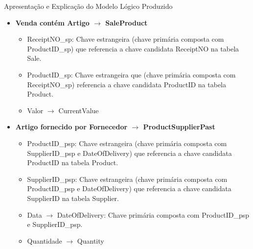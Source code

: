 \documentclass[compress,svgnames,handout,13.7pt]{beamer}
\begin{document}
\begin{frame}{Apresentação e Explicação do Modelo Lógico Produzido}
    \begin{itemize}
        \item{\textbf{Venda contém Artigo $\rightarrow$ SaleProduct}}
            \begin{itemize}
                \item{ReceiptNO\_sp:} Chave estrangeira (chave primária composta com ProductID\_sp) 
                que referencia a chave candidata ReceiptNO na tabela Sale.
                \item{ProductID\_sp:} Chave estrangeira que (chave primária composta com ReceiptNO\_sp)
                referencia a chave candidata ProductID na tabela Product.
                \item{Valor $\rightarrow$ CurrentValue}
            \end{itemize}
        \item{\textbf{Artigo fornecido por Fornecedor $\rightarrow$ ProductSupplierPast}}
            \begin{itemize}
                \item{ProductID\_psp:} Chave estrangeira (chave primária composta com SupplierID\_psp e DateOfDelivery)
                que referencia a chave candidata ProductID na tabela Product.
                \item{SupplierID\_psp:} Chave estrangeira (chave primária composta com ProductID\_psp e DateOfDelivery)
                que referencia a chave candidata SupplierID na tabela Supplier.
                \item{Data $\rightarrow$ DateOfDelivery:} Chave primária composta com ProductID\_psp e SupplierID\_psp. 
                \item{Quantidade $\rightarrow$ Quantity}
            \end{itemize}
    \end{itemize}
\end{frame}
\end{document}
